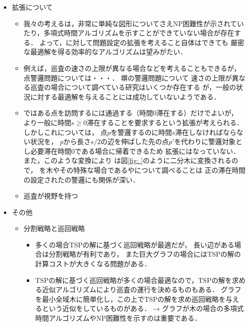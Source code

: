 \begin{itemize}
  \item 拡張について
  \begin{itemize}
    \item
      我々の考える{\patProb}は，非常に単純な図形についてさえNP困難性が示されていたり，多項式時間アルゴリズムを示すことができていない場合が存在する．
      よって，{\patProb}に対して問題設定の拡張を考えること自体はできても
      厳密な最適解を得る効率的なアルゴリズムは望みがたい．
    \item 例えば，巡査の速さの上限が異なる場合などを考えることもできるが，
      点警邏問題については・・・．
      塀の警邏問題について
      速さの上限が異なる巡査の場合について調べている研究はいくつか存在する\cite{}
      が，一般の状況に対する最適解を与えることには成功していないようである\cite{}．
    \item {\patProb}ではある点を訪問するには通過する（時間$0$滞在する）だけでよいが，
      より一般に時間$s \geq 0$滞在することを要求するという拡張が考えられる．
      しかしこれについては，
      点$p$を警邏するのに時間$s$滞在しなければならない状況を，
      $p$から長さ$s/2$の辺を伸ばした先の点$p'$を代わりに警邏対象とし必要滞在時間$0$である場合に帰着できるため
      拡張にはなっていない．
      また，このような変換により
      {\graphLine}は図\ref{fig: }のように二分木に変換されるので，
      {\patProb}を木やその特殊な場合である{\graphStar}や{\graphUnit}について調べることは
      正の滞在時間の設定された{\graphLine}の警邏にも関係が深い．
    \item 巡査が視野を持つ
  \end{itemize}

  \item その他
  \begin{itemize}
    \item 分割戦略と巡回戦略
    \begin{itemize}
      \item 多くの場合TSPの解に基づく巡回戦略が最適だが，
        長い辺がある場合は分割戦略が有利であり，
        また巨大グラフの場合にはTSPの解の計算コストが大きくなる問題がある．
      \item TSPの解に基づく巡回戦略が多くの場合最適なので，TSPの解を求める近似アルゴリズムにより巡査の運行を決めるものもある．
      グラフを最小全域木に簡単化し，この上でTSPの解を求め巡回戦略を与えるという近似をしているものがある．
      → グラフが木の場合の多項式時間アルゴリズムやNP困難性を示すのは重要である．
    \end{itemize} 
  \end{itemize}
\end{itemize}



